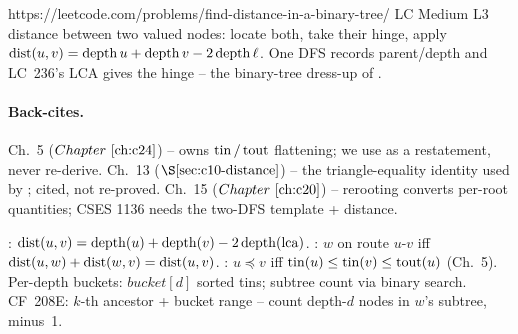\begin{practiceset}
    {https://leetcode.com/problems/find-distance-in-a-binary-tree/}
    {LC Medium L3}
    {distance between two valued nodes: locate both, take their hinge,
     apply \(\operatorname{dist}(u,v)=\operatorname{depth} u+\operatorname{depth} v-2\operatorname{depth}\ell\).  One DFS records
     parent/depth and LC~236's LCA gives the hinge -- the binary-tree
     dress-up of .}
\end{practiceset}

\paragraph{Back-cites.}
Ch.~5 (\(\chref{c24}\)) -- owns \(\operatorname{tin}/\operatorname{tout}\) flattening; we use
 as a restatement, never re-derive.
Ch.~13 (\(\secref{c10-distance}\)) -- the triangle-equality identity used
by ; cited, not re-proved.
Ch.~15 (\(\chref{c20}\)) -- rerooting converts per-root quantities; CSES
1136 needs the two-DFS template + distance.

\begin{recallbox}
: \(\operatorname{dist}(u,v) = \operatorname{depth}(u)+\operatorname{depth}(v)-2\operatorname{depth}(\operatorname{lca})\).
: \(w\) on route \(u\)-\(v\) iff
\(\operatorname{dist}(u,w)+\operatorname{dist}(w,v)=\operatorname{dist}(u,v)\).
: \(u\preceq v\) iff \(\operatorname{tin}(u)\le\operatorname{tin}(v)\le\operatorname{tout}(u)\)
(Ch.~5).  Per-depth buckets: \(\mathit{bucket}[d]\) sorted tins; subtree
count via binary search.  CF~208E: \(k\)-th ancestor + bucket range --
count depth-\(d\) nodes in \(w\)'s subtree, minus~1.
\end{recallbox}

